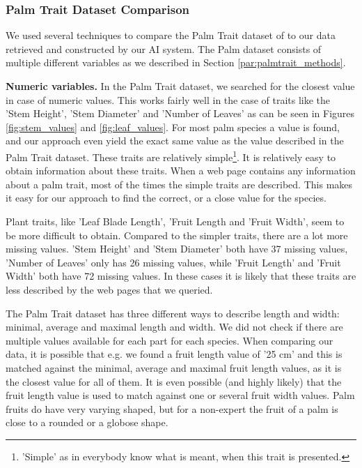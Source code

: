 \documentclass[a4paper, 12pt, oneside]{book} %
\begin{document}





\subsubsection{Palm Trait Dataset Comparison}
We used several techniques to compare the Palm Trait dataset of \textcite{kissling_palmtraits_2019} to our data retrieved and constructed by our AI system.
The Palm dataset consists of multiple different variables as we described in Section \ref{par:palmtrait_methods}.


\noindent
\newline
\textbf{Numeric variables.}
In the Palm Trait dataset, we searched for the closest value in case of numeric values.
This works fairly well in the case of traits like the 'Stem Height', 'Stem Diameter' and 'Number of Leaves' as can be seen in Figures \ref{fig:stem_values} and \ref{fig:leaf_values}.
For most palm species a value is found, and our approach even yield the exact same value as the value described in the Palm Trait dataset. 
These traits are relatively simple\footnote{'Simple' as in everybody know what is meant, when this trait is presented.}.
It is relatively easy to obtain information about these traits.
When a web page contains any information about a palm trait, most of the times the simple traits are described.
This makes it easy for our approach to find the correct, or a close value for the species.

Plant traits, like 'Leaf Blade Length', 'Fruit Length and 'Fruit Width', seem to be more difficult to obtain. 
Compared to the simpler traits, there are a lot more missing values.
'Stem Height' and 'Stem Diameter' both have 37 missing values, 'Number of Leaves' only has 26 missing values, while 'Fruit Length' and 'Fruit Width' both have 72 missing values.
In these cases it is likely that these traits are less described by the web pages that we queried.

The Palm Trait dataset has three different ways to describe length and width: minimal, average and maximal length and width.
We did not check if there are multiple values available for each part for each species.
When comparing our data, it is possible that e.g. we found a fruit length value of '25 cm' and this is matched against the minimal, average and maximal fruit length values, as it is the closest value for all of them.
It is even possible (and highly likely) that the fruit length value is used to match against one or several fruit width values.
Palm fruits do have very varying shaped, but for a non-expert the fruit of a palm is close to a rounded or a globose shape.
\end{document}
